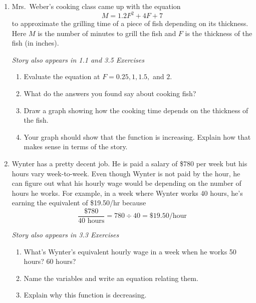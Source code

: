 \begin{enumerate}
\item Mrs.\ Weber's cooking class came up with the equation $$M = 1.2F^2+4F+7$$ to approximate the grilling time of a piece of fish depending on its thickness.  Here $M$ is the number of minutes to grill the fish and $F$ is the thickness of the fish (in inches).  

\hfill \emph{Story also appears in 1.1 and 3.5 Exercises}
\begin{enumerate}
\item Evaluate the equation at $F=0.25, 1, 1.5,$ and $2$.
\item What do the answers you found say about cooking fish?
\item Draw a graph showing how the cooking time depends on the thickness of the fish.
\item Your graph should show that the function is increasing.  Explain how that makes sense in terms of the story.
\end{enumerate} 

\item Wynter has a pretty decent job. He is paid a salary of \$780 per week but his hours vary week-to-week. Even though Wynter is not paid by the hour, he can figure out what his hourly wage would be depending on the number of hours he works.  For example, in a week where Wynter works 40 hours, he's earning the equivalent of \$19.50/hr because $$\frac{\$780}{40 \text{ hours}} = 780 \div 40 =\$19.50\text{/hour}$$

\hfill \emph{Story also appears in 3.3 Exercises}
\begin{enumerate}
\item What's Wynter's equivalent hourly wage in a week when he works 50 hours? 60 hours?
\item Name the variables and write an equation relating them.
\item Explain why this function is decreasing.
\end{enumerate} 


\end{enumerate}
